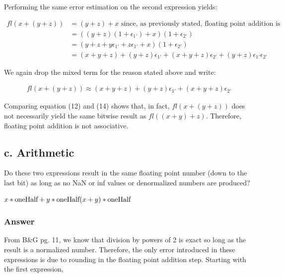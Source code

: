 \documentclass{article}
\newcommand{\n}{\newline}
\begin{document}
	Performing the same error estimation on the second expression yields:
	
	\begin{equation}
		\begin{split}
		fl(x+(y+z))&=(y+z)+x \text{ since, as previously stated, floating point addition is commutative }\\
		&=((y+z)(1+\epsilon_{1'})+x)(1+\epsilon_{2'})\\
		&=(y+z+y\epsilon_{1'}+z\epsilon_{1'}+x)(1+\epsilon_{2'})\\
		&=(x+y+z)+(y+z)\epsilon_{1'}+(x+y+z)\epsilon_{2'}+(y+z)\epsilon_{1'}\epsilon_{2'}
		\end{split}
	\end{equation}
	
	We again drop the mixed term for the reason stated above and write:
	
	\begin{equation}
		\begin{split}
		fl(x+(y+z))\approx(x+y+z)+(y+z)\epsilon_{1'}+(x+y+z)\epsilon_{2'}
		\end{split}
	\end{equation}
	
	Comparing equation (12) and (14) shows that, in fact, $fl(x+(y+z))$ does not necessarily yield the same bitwise result as $fl((x+y)+z)$.  Therefore, floating point addition is not associative.
	
	  
	
	\subsection{c. Arithmetic}
	Do these two expressions result in the same floating point number (down to the last bit) as long as no NaN or inf values or denormalized numbers are produced? \n
	
	\begin{flushleft}
	\begin{math}
	x*\text{oneHalf}+y*\text{oneHalf}\n
	(x+y)*\text{oneHalf}
	\end{math}
	\end{flushleft}
	
	\subsubsection{Answer}
	From B\&G pg. 11, we know that division by powers of 2 is exact so long as the result is a normalized number.  Therefore, the only error introduced in these expressions is due to rounding in the floating point addition step.  Starting with the first expression,
	
\end{document}
